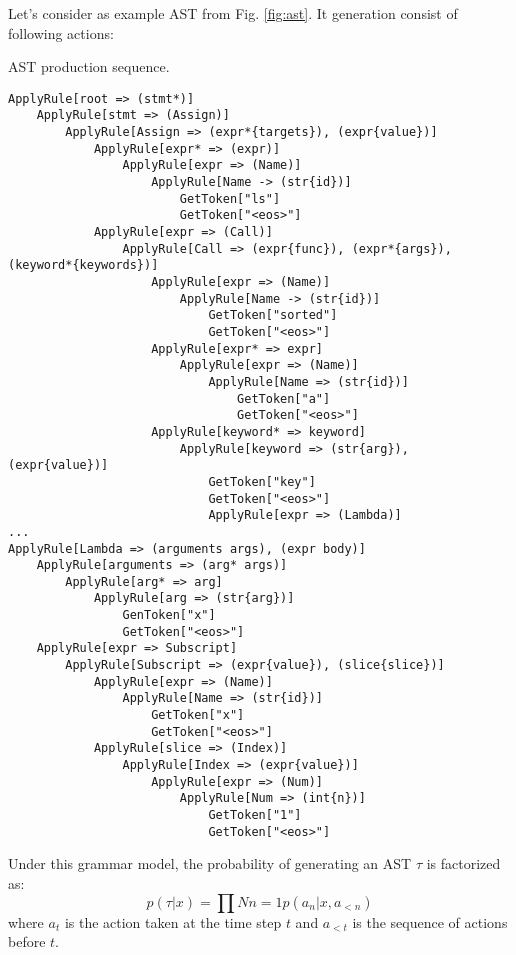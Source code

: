 Let's consider as example AST from Fig. \ref{fig:ast}. It generation consist of following actions:

\begin{codelist}{AST production sequence.}
\begin{verbatim}
ApplyRule[root => (stmt*)]
    ApplyRule[stmt => (Assign)]
        ApplyRule[Assign => (expr*{targets}), (expr{value})]
            ApplyRule[expr* => (expr)]
                ApplyRule[expr => (Name)]
                    ApplyRule[Name -> (str{id})]
                        GetToken["ls"]
                        GetToken["<eos>"]
            ApplyRule[expr => (Call)]
                ApplyRule[Call => (expr{func}), (expr*{args}), (keyword*{keywords})]
                    ApplyRule[expr => (Name)]
                        ApplyRule[Name -> (str{id})]
                            GetToken["sorted"]
                            GetToken["<eos>"]
                    ApplyRule[expr* => expr]
                        ApplyRule[expr => (Name)]
                            ApplyRule[Name => (str{id})]
                                GetToken["a"]
                                GetToken["<eos>"]
                    ApplyRule[keyword* => keyword]
                        ApplyRule[keyword => (str{arg}), (expr{value})]
                            GetToken["key"]
                            GetToken["<eos>"]
                            ApplyRule[expr => (Lambda)]
...
ApplyRule[Lambda => (arguments args), (expr body)]
    ApplyRule[arguments => (arg* args)]
        ApplyRule[arg* => arg]
            ApplyRule[arg => (str{arg})]
                GenToken["x"]
                GetToken["<eos>"]
    ApplyRule[expr => Subscript]
        ApplyRule[Subscript => (expr{value}), (slice{slice})]
            ApplyRule[expr => (Name)]
                ApplyRule[Name => (str{id})]
                    GetToken["x"]
                    GetToken["<eos>"]
            ApplyRule[slice => (Index)]
                ApplyRule[Index => (expr{value})]
                    ApplyRule[expr => (Num)]
                        ApplyRule[Num => (int{n})]
                            GetToken["1"]
                            GetToken["<eos>"]
\end{verbatim}
\label{code:ast_production}
\end{codelist}

Under this grammar model, the probability of generating an AST $\tau$ is factorized as:
\begin{equation}
p(\tau|x) = \prod{N}{n=1} p(a_n|x, a_{<n})
\label{eqn:tree_probability}
\end{equation}
where $a_t$ is the action taken at the time step $t$ and $a_{<t}$ is the sequence of actions before $t$. 

